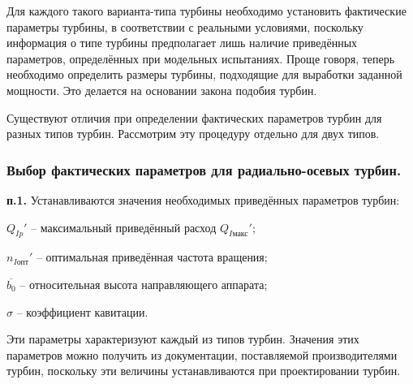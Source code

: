Для каждого такого варианта-типа турбины необходимо установить фактические параметры турбины, в соответствии с реальными условиями, поскольку информация о типе турбины предполагает лишь наличие приведённых параметров, определённых при модельных испытаниях. Проще говоря, теперь необходимо определить размеры турбины, подходящие для выработки заданной мощности. Это делается на основании закона подобия турбин.


Существуют отличия при определении фактических параметров турбин для разных типов турбин. Рассмотрим эту процедуру отдельно для двух типов.


\vspace{1.5cm}



\subsubsection{Выбор фактических параметров для радиально-осевых турбин.}



\textbf{п.1.} Устанавливаются значения необходимых приведённых параметров турбин:

\vspace{0.5cm}

$Q_{Ip}'$ -- максимальный приведённый расход $Q_{I\text{макс}}'$;

$n_{I\text{опт}}'$ -- оптимальная приведённая частота вращения;

$\overline{b_0}$ -- относительная высота направляющего аппарата;

$\sigma$ -- коэффициент кавитации.

\vspace{0.5cm}

Эти параметры характеризуют каждый из типов турбин. Значения этих параметров можно получить из документации, поставляемой производителями турбин, поскольку эти величины устанавливаются при проектировании турбин. 

